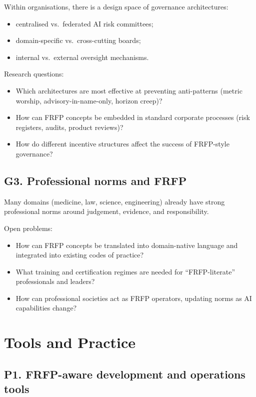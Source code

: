 Within organisations, there is a design space of governance
architectures:

\begin{itemize}
  \item centralised vs.\ federated AI risk committees;
  \item domain-specific vs.\ cross-cutting boards;
  \item internal vs.\ external oversight mechanisms.
\end{itemize}

Research questions:

\begin{itemize}
  \item Which architectures are most effective at preventing
        anti-patterns (metric worship, advisory-in-name-only, horizon
        creep)?
  \item How can FRFP concepts be embedded in standard corporate
        processes (risk registers, audits, product reviews)?
  \item How do different incentive structures affect the success of
        FRFP-style governance?
\end{itemize}

\subsection{G3. Professional norms and FRFP}

Many domains (medicine, law, science, engineering) already have strong
professional norms around judgement, evidence, and responsibility.

Open problems:

\begin{itemize}
  \item How can FRFP concepts be translated into domain-native
        language and integrated into existing codes of practice?
  \item What training and certification regimes are needed for
        ``FRFP-literate'' professionals and leaders?
  \item How can professional societies act as FRFP operators,
        updating norms as AI capabilities change?
\end{itemize}

\section{Tools and Practice}

\subsection{P1. FRFP-aware development and operations tools}

